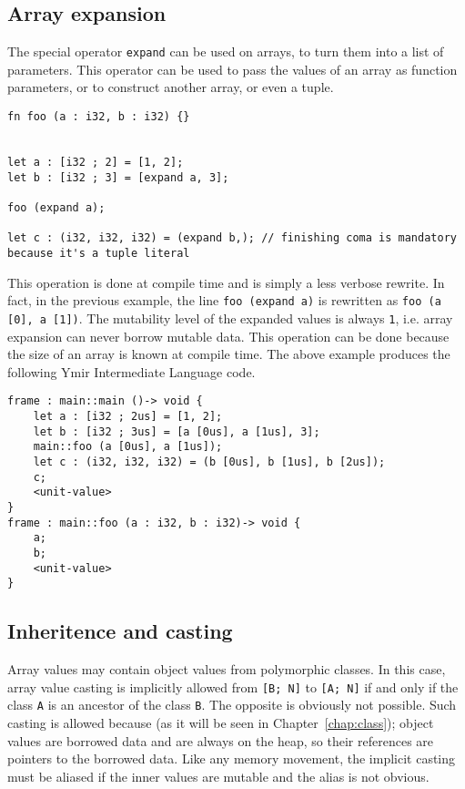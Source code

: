 \subsection {Array expansion}

The special operator \texttt{expand} can be used on arrays, to turn them into a
list of parameters. This operator can be used to pass the values of an array as
function parameters, or to construct another array, or even a tuple.

\begin{lstlisting}[style=coloredverbatim]
fn foo (a : i32, b : i32) {}


let a : [i32 ; 2] = [1, 2];
let b : [i32 ; 3] = [expand a, 3];

foo (expand a);

let c : (i32, i32, i32) = (expand b,); // finishing coma is mandatory because it's a tuple literal
\end{lstlisting}

This operation is done at compile time and is simply a less verbose rewrite. In
fact, in the previous example, the line \texttt{foo (expand a)} is rewritten as
\texttt{foo (a [0], a [1])}. The mutability level of the expanded values is
always \texttt{1}, i.e. array expansion can never borrow mutable data. This
operation can be done because the size of an array is known at compile time. The
above example produces the following Ymir Intermediate Language code.

\begin{lstlisting}[style=intermediateVerb]
frame : main::main ()-> void {
    let a : [i32 ; 2us] = [1, 2];
    let b : [i32 ; 3us] = [a [0us], a [1us], 3];
    main::foo (a [0us], a [1us]);
    let c : (i32, i32, i32) = (b [0us], b [1us], b [2us]);
    c;
    <unit-value>
}
frame : main::foo (a : i32, b : i32)-> void {
    a;
    b;
    <unit-value>
}
\end{lstlisting}


\subsection{Inheritence and casting}

Array values may contain object values from polymorphic classes. In this case,
array value casting is implicitly allowed from \texttt{[B; N]} to \texttt{[A;
    N]} if and only if the class \texttt{A} is an ancestor of the class
\texttt{B}. The opposite is obviously not possible. Such casting is allowed
because (as it will be seen in Chapter~\ref{chap:class}); object values are
borrowed data and are always on the heap, so their references are pointers to
the borrowed data. Like any memory movement, the implicit casting must be
aliased if the inner values are mutable and the alias is not obvious.

